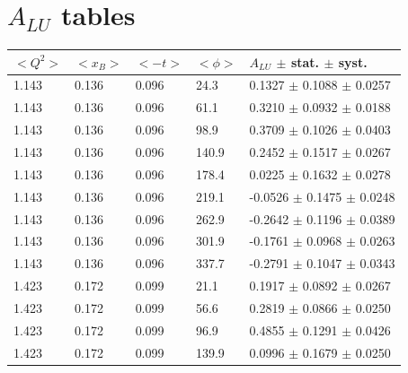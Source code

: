 \chapter{$A_{LU}$ tables}
\begin{table}[!h]
   \begin{center}
      \begin{tabular}{||l|l|l|l|l||}
         \hline
 $<Q^{2}>$ & $<x_{B}>$ & $<-t>$ & $<\phi>$ & $A_{LU}$ $\pm$ stat. $\pm$ syst.\\
         \hline
  1.143 & 0.136 & 0.096 & 24.3  &  0.1327 $\pm$ 0.1088 $\pm$ 0.0257 \\                                             
  1.143 & 0.136 & 0.096 & 61.1  &  0.3210 $\pm$ 0.0932 $\pm$ 0.0188 \\                                             
  1.143 & 0.136 & 0.096 & 98.9  &  0.3709 $\pm$ 0.1026 $\pm$ 0.0403 \\                                             
  1.143 & 0.136 & 0.096 & 140.9 &  0.2452 $\pm$ 0.1517 $\pm$ 0.0267 \\                                             
  1.143 & 0.136 & 0.096 & 178.4 &  0.0225 $\pm$ 0.1632 $\pm$ 0.0278 \\                                             
  1.143 & 0.136 & 0.096 & 219.1 & -0.0526 $\pm$ 0.1475 $\pm$ 0.0248 \\                                             
  1.143 & 0.136 & 0.096 & 262.9 & -0.2642 $\pm$ 0.1196 $\pm$ 0.0389 \\                                             
  1.143 & 0.136 & 0.096 & 301.9 & -0.1761 $\pm$ 0.0968 $\pm$ 0.0263 \\                                             
  1.143 & 0.136 & 0.096 & 337.7 & -0.2791 $\pm$ 0.1047 $\pm$ 0.0343 \\                                             
  \hline                                                                                                           
  1.423 & 0.172 & 0.099 & 21.1  &  0.1917 $\pm$ 0.0892 $\pm$ 0.0267 \\                                             
  1.423 & 0.172 & 0.099 & 56.6  &  0.2819 $\pm$ 0.0866 $\pm$ 0.0250 \\                                             
  1.423 & 0.172 & 0.099 & 96.9  &  0.4855 $\pm$ 0.1291 $\pm$ 0.0426 \\                                             
  1.423 & 0.172 & 0.099 & 139.9 &  0.0996 $\pm$ 0.1679 $\pm$ 0.0250 \\                                             

\end{tabular}
\end{center}
\end{table}
